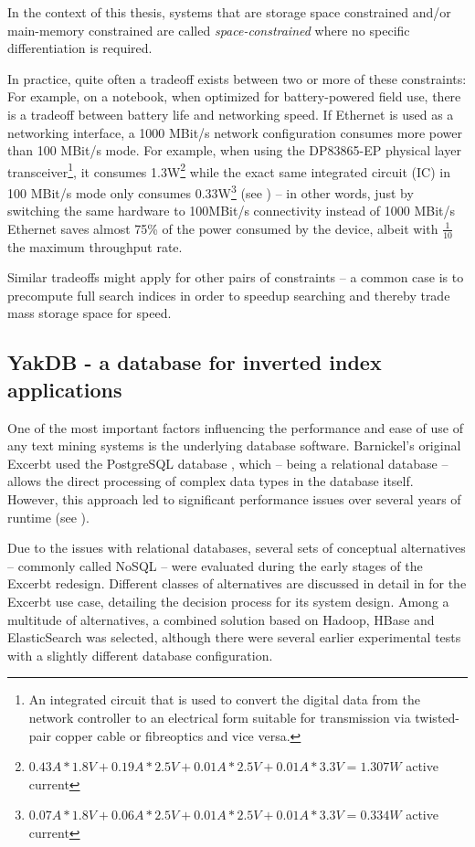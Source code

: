 \documentclass[a4paper, 12pt, twoside, reqn]{report}
\numberwithin{figure}{chapter}
\newtheorem[L]{boxedDefinition}{Definition}
\newtheorem[L]{boxedExample}{Example}
\begin{document}
In the context of this thesis, systems that are storage space constrained and/or main-memory constrained are called \textit{space-constrained} where no specific differentiation is required.

In practice, quite often a tradeoff exists between two or more of these constraints: For example, on a notebook, when optimized for battery-powered field use, there is a tradeoff between battery life and networking speed. If Ethernet is used as a networking interface, a \num{1000} MBit/s network configuration consumes more power than 100 MBit/s mode. For example, when using the DP83865-EP physical layer transceiver\footnote{An integrated circuit that is used to convert the digital data from the network controller to an electrical form suitable for transmission via twisted-pair copper cable  or fibreoptics and vice versa.}, it consumes 1.3W\footnote{$0.43A * 1.8V + 0.19A * 2.5V + 0.01A * 2.5V + 0.01A * 3.3V = 1.307W$ active current} while the exact same integrated circuit (IC) in 100 MBit/s mode only consumes 0.33W\footnote{$0.07A * 1.8V + 0.06A * 2.5V + 0.01A * 2.5V + 0.01A * 3.3V = 0.334W$ active current} (see \cite[section 6.10]{dp83865}) -- in other words, just by switching the same hardware to 100MBit/s connectivity instead of \num{1000} MBit/s Ethernet saves almost 75\% of the power consumed by the device, albeit with $\frac{1}{10}$ the maximum throughput rate.

Similar tradeoffs might apply for other pairs of constraints -- a common case is to precompute full search indices in order to speedup searching and thereby trade mass storage space for speed.

\subsection{YakDB - a database for inverted index applications}\label{sec:databases}

One of the most important factors influencing the performance and ease of use of any text mining systems is the underlying database software. Barnickel's original Excerbt used the PostgreSQL database , which -- being a relational database -- allows the direct processing of complex data types in the database itself. However, this approach led to significant performance issues over several years of runtime (see \cite[section 4.5]{wachinger2013next}).

Due to the issues with relational databases, several sets of conceptual alternatives -- commonly called NoSQL -- were evaluated during the early stages of the Excerbt redesign. Different classes of alternatives are discussed in detail in \cite[section 2.4]{wachinger2013next} for the Excerbt use case, detailing the decision process for its system design. Among a multitude of alternatives, a combined solution based on Hadoop, HBase and ElasticSearch was selected, although there were several earlier experimental tests with a slightly different database configuration.
\end{document}
